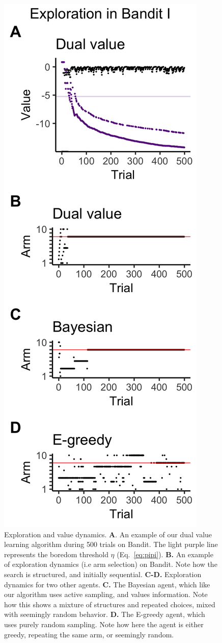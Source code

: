\begin{figure}
	[tbhp] \centering 
	\includegraphics[width=.3\linewidth]{figures/subfig3.png} 
	\caption{\label{fig:supf3} Exploration and value dynamics.
	\textbf{A}. An example of our dual value learning algorithm during 500 trials on Bandit. The light purple line represents the boredom threshold $\eta$ (Eq.~\ref{eq:pipi}).
	\textbf{B.} An example of exploration dynamics (i.e arm selection) on Bandit. Note how the search is structured, and initially sequential.  
	\textbf{C-D.} Exploration dynamics for two other agents. \textbf{C.} The Bayesian agent, which like our algorithm uses active sampling, and values information. Note how this shows a mixture of structures and repeated choices, mixed with seemingly random behavior. \textbf{D.} The E-greedy agent, which uses purely random sampling. Note how here the agent is either greedy, repeating the same arm, or seemingly random.}
\end{figure}
